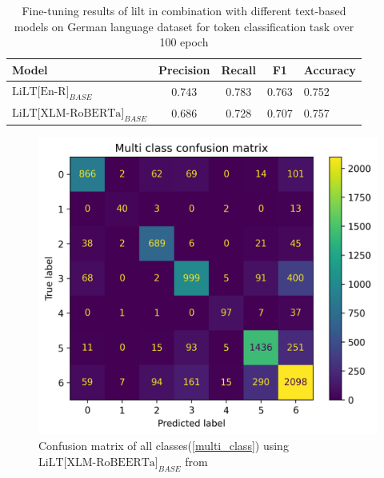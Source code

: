 \begin{table}[!ht]
    \centering
    \captionsetup{justification=centering}
    \begin{tabular}{lcccl}
        \toprule
        \textbf{Model}& \textbf{Precision}& \textbf{Recall}& \textbf{F1} & \textbf{Accuracy}\\ \midrule
         \(\text{LiLT[En-R]}_{BASE}\) &  0.743& 0.783& 0.763& 0.752 \\
         \(\text{LiLT[XLM-RoBERTa]}_{BASE}\)& 0.686& 0.728& 0.707& 0.757 \\ \midrule
    \end{tabular}
    \caption{Fine-tuning results of \acrshort{lilt} in combination with different text-based models on German language dataset for token classification task over 100 epoch}
    \label{tab:100_epoch_results}
\end{table}



\begin{figure}[!ht]
    \centering
    \includegraphics[width=0.6 \textwidth]{chapters/images/experiments_and_results/XLM_100_output.png}
    \caption{Confusion matrix of all classes(\ref{multi_class}) using \(\text{LiLT[XLM-RoBEERTa]}_{BASE}\) from }
    \label{fig:Multi-class_XLM}
\end{figure} 

